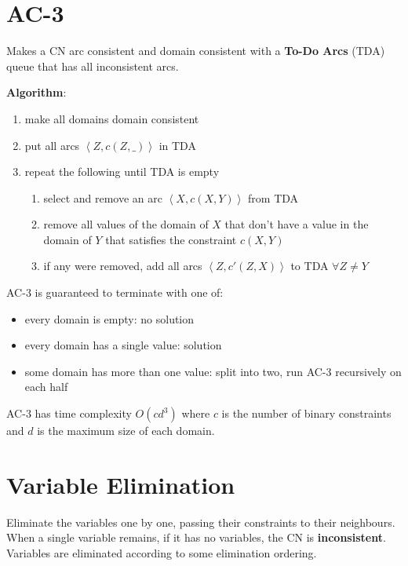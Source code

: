 \documentclass[11pt]{article}
\begin{document}
\section{AC-3}
\label{sec:org41bbc92}
Makes a CN arc consistent and domain consistent with a \textbf{To-Do Arcs} (TDA) queue that has all inconsistent arcs.

\textbf{Algorithm}:
\begin{enumerate}
\item make all domains domain consistent
\item put all arcs \(\left< Z, c(Z, \_) \right>\) in TDA
\item repeat the following until TDA is empty
\begin{enumerate}
\item select and remove an arc \(\left< X, c(X, Y) \right>\) from TDA
\item remove all values of the domain of \(X\) that don't have a value in the domain of \(Y\) that satisfies
the constraint \(c(X, Y)\)
\item if any were removed, add all arcs \(\left< Z, c'(Z, X) \right>\) to TDA \(\forall Z \ne Y\)
\end{enumerate}
\end{enumerate}

AC-3 is guaranteed to terminate with one of:
\begin{itemize}
\item every domain is empty: no solution
\item every domain has a single value: solution
\item some domain has more than one value: split into two, run AC-3 recursively on each half
\end{itemize}

AC-3 has time complexity \(O(cd^{3})\) where \(c\) is the number of binary constraints and \(d\) is the maximum
size of each domain.
\section{Variable Elimination}
\label{sec:org51c8325}
Eliminate the variables one by one, passing their constraints to their neighbours.
When a single variable remains, if it has no variables, the CN is \textbf{inconsistent}.
Variables are eliminated according to some elimination ordering.
\end{document}

